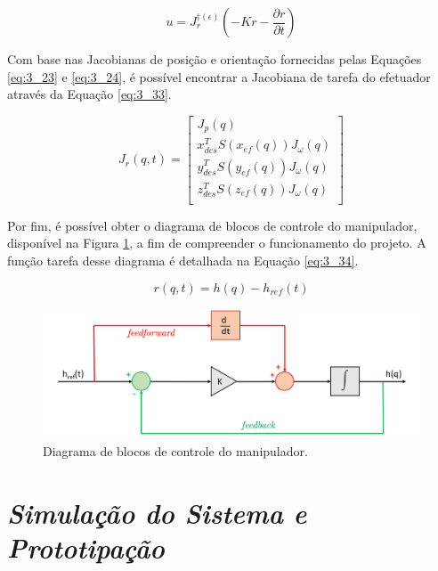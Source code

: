 \begin{equation}
u = J_r^{\dagger (\epsilon)} (-Kr - \frac{\partial r}{\partial t})
\label{eq:3_32}
\end{equation}

Com base nas Jacobianas de posição e orientação fornecidas pelas Equações \ref{eq:3_23} e \ref{eq:3_24}, é possível encontrar a Jacobiana de tarefa do efetuador através da Equação \ref{eq:3_33}.

\begin{equation}
J_r(q,t) =
\begin{bmatrix}
J_p(q)\\
x_{des}^T S(x_{ef}(q)) J_{\omega}(q)\\
y_{des}^T S(y_{ef}(q)) J_{\omega}(q)\\
z_{des}^T S(z_{ef}(q)) J_{\omega}(q)\\
\end{bmatrix}
\label{eq:3_33}
\end{equation}


Por fim, é possível obter o diagrama de blocos de controle do manipulador, disponível na Figura \ref{fig:DiagramaBlocos}, a fim de compreender o funcionamento do projeto. A função tarefa desse diagrama é detalhada na Equação \ref{eq:3_34}.

\begin{equation}
r(q,t) = h(q) - h_{ref}(t)
\label{eq:3_34}
\end{equation}

\begin{figure}[h!]
\centering
\includegraphics[width=0.7\columnwidth]{Imagens/DiagramaBlocos.PNG}
\caption{Diagrama de blocos de controle do manipulador.}
\label{fig:DiagramaBlocos}
\end{figure}

\section{\textit{Simulação do Sistema e Prototipação}}\label{sec:Cap3_Simulador}

